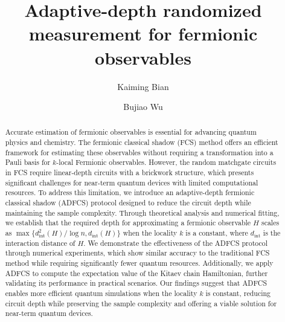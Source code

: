 \documentclass[showpacs,twocolumn,aps,prx,long bibliography,superscriptaddress,notitlepage]{revtex4-1}
\newcommand{\cbra}[1]{\{ #1 \}}
\begin{document}
\title{Adaptive-depth randomized measurement for fermionic observables}
\author{Kaiming Bian}
\author{Bujiao Wu}

\begin{abstract}
Accurate estimation of fermionic observables is essential for advancing quantum physics and chemistry. The fermionic classical shadow (FCS) method offers an efficient framework for estimating these observables without requiring a transformation into a Pauli basis for $k$-local Fermionic observables. However, the random matchgate circuits in FCS require linear-depth circuits with a brickwork structure, which presents significant challenges for near-term quantum devices with limited computational resources.
To address this limitation, we introduce an adaptive-depth fermionic classical shadow (ADFCS) protocol designed to reduce the circuit depth while maintaining the sample complexity. 
Through theoretical analysis and numerical fitting, we establish that the required depth for approximating a fermionic observable $H$ scales as $\max\cbra{d^2_{\text{int}}(H)/\log n, d_{\text{int}}(H)}$ when the locality $k$ is a constant, where $d_{\text{int}}$ is the interaction distance of $H$.
We demonstrate the effectiveness of the ADFCS protocol through numerical experiments, which show similar accuracy to the traditional FCS method while requiring significantly fewer quantum resources. Additionally, we apply ADFCS to compute the expectation value of the Kitaev chain Hamiltonian, further validating its performance in practical scenarios. 
Our findings suggest that ADFCS enables more efficient quantum simulations when the locality $k$ is constant, reducing circuit depth while preserving the sample complexity and offering a viable solution for near-term quantum devices.
\end{abstract}
\maketitle
\end{document}
